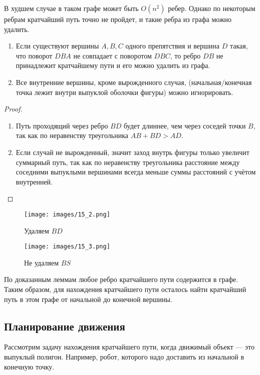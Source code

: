 В худшем случае в таком графе может быть $O(n^2)$ ребер.
Однако по некоторым ребрам кратчайший путь точно не пройдет, и такие ребра из графа можно удалить. 

\begin{lemma}
    \begin{enumerate}
        \item Если существуют вершины $A,B,C$ одного препятствия и вершина $D$ такая, что поворот $DBA$ не совпадает с поворотом $DBC$, то ребро $DB$ не принадлежит кратчайшему пути и его можно удалить из графа.
        \item Все внутренние вершины, кроме вырожденного случая, (начальная/конечная точка лежит внутри выпуклой оболочки фигуры) можно игнорировать.
    \end{enumerate}
\end{lemma}
\begin{proof}
    \begin{enumerate}
        \item Путь проходящий через ребро $BD$ будет длиннее, чем через соседей точки $B$, так как по неравенству треугольника $AB+BD>AD$.
        \item Если случай не вырожденный, значит заход внутрь фигуры только увеличит суммарный путь, так как по неравенству треугольника расстояние между соседними выпуклыми вершинами всегда меньше суммы расстояний с учётом внутренней.
    \end{enumerate}
\end{proof}

\begin{figure}
    \centering
    \texttt{[image: images/15\_2.png]}
    \caption{Удаляем $BD$}
\end{figure}

\begin{figure}
    \centering
    \texttt{[image: images/15\_3.png]}
    \caption{Не удаляем $BS$}
\end{figure}

По доказанным леммам любое ребро кратчайшего пути содержится в графе.
Таким образом, для нахождения кратчайшего пути осталось найти кратчайший путь в этом графе от начальной до конечной вершины. 

\subsection{Планирование движения}

Рассмотрим задачу нахождения кратчайшего пути, когда движимый объект --- это выпуклый полигон.
Например, робот, которого надо доставить из начальной в конечную точку. 

